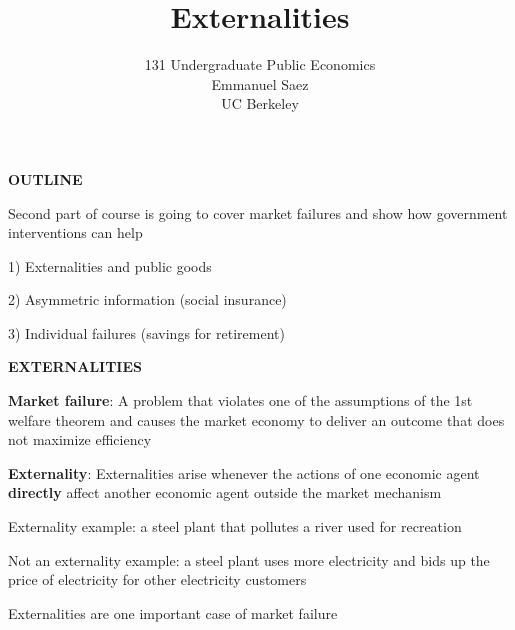 \documentclass[landscape]{slides}
\author{131 Undergraduate Public Economics \\ Emmanuel Saez \\ UC Berkeley}
\date{}
\title{Externalities} \onlyslides{1-300}
\begin{document}
\begin{slide}
\maketitle
\end{slide}

\begin{slide}
\begin{center}
{\bf OUTLINE}
\end{center}

Second part of course is going to cover market failures and show how government interventions can help

1) Externalities and public goods

2) Asymmetric information (social insurance)

3) Individual failures (savings for retirement)

\end{slide}

%
%
%

%

\begin{slide}
\begin{center}
{\bf EXTERNALITIES}
\end{center}

{\bf Market failure}:
A problem that violates one of the assumptions of the 1st welfare theorem and
 causes the market economy to deliver an outcome that does not maximize efficiency

{\bf Externality}:
Externalities arise whenever the actions of one economic agent \textbf{directly} affect another economic agent
outside the market mechanism

Externality example: a steel plant that pollutes a river used for recreation

Not an externality example: a steel plant uses more electricity and bids up the price of electricity
for other electricity customers

Externalities are one important case of market failure

\end{slide}
\end{document}
